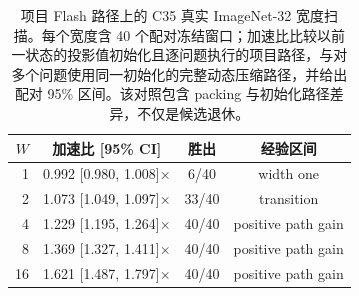 \begin{table}[t]
\centering
\caption{项目 Flash 路径上的 C35 真实 ImageNet-32 宽度扫描。每个宽度含 40 个配对冻结窗口；加速比比较以前一状态的投影值初始化且逐问题执行的项目路径，与对多个问题使用同一初始化的完整动态压缩路径，并给出配对 95\% 区间。该对照包含 packing 与初始化路径差异，不仅是候选退休。}
\label{tab:width-regime}
\scriptsize
\setlength{\tabcolsep}{3.2pt}
\begin{tabular}{@{}rccc@{}}
\toprule
$W$ & 加速比 [95\% CI] & 胜出 & 经验区间 \\
\midrule
1  & 0.992 [0.980, 1.008]$\times$ & 6/40  & width one \\
2  & 1.073 [1.049, 1.097]$\times$ & 33/40 & transition \\
4  & 1.229 [1.195, 1.264]$\times$ & 40/40 & positive path gain \\
8  & 1.369 [1.327, 1.411]$\times$ & 40/40 & positive path gain \\
16 & 1.621 [1.487, 1.797]$\times$ & 40/40 & positive path gain \\
\bottomrule
\end{tabular}
\end{table}
